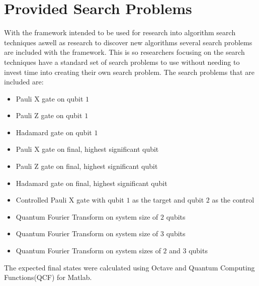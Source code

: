 \section{Provided Search Problems}
\label{sec:provsearchprobs}
With the framework intended to be used for research into algorithm search techniques aswell as research to discover new algorithms several search problems are included with the framework.
This is so researchers focusing on the search techniques have a standard set of search problems to use without needing to invest time into creating their own search problem.
The search problems that are included are:
\begin{itemize}
 \item Pauli X gate on qubit $1$
 \item Pauli Z gate on qubit $1$
 \item Hadamard gate on qubit $1$
 \item Pauli X gate on final, highest significant qubit
 \item Pauli Z gate on final, highest significant qubit
 \item Hadamard gate on final, highest significant qubit
 \item Controlled Pauli X gate with qubit $1$ as the target and qubit $2$ as the control
 \item Quantum Fourier Transform on system size of $2$ qubits
 \item Quantum Fourier Transform on system size of $3$ qubits
 \item Quantum Fourier Transform on system sizes of $2$ and $3$ qubits
\end{itemize}

The expected final states were calculated using Octave\cite{octweb} and Quantum Computing Functions(QCF) for Matlab\cite{qcfweb}.

